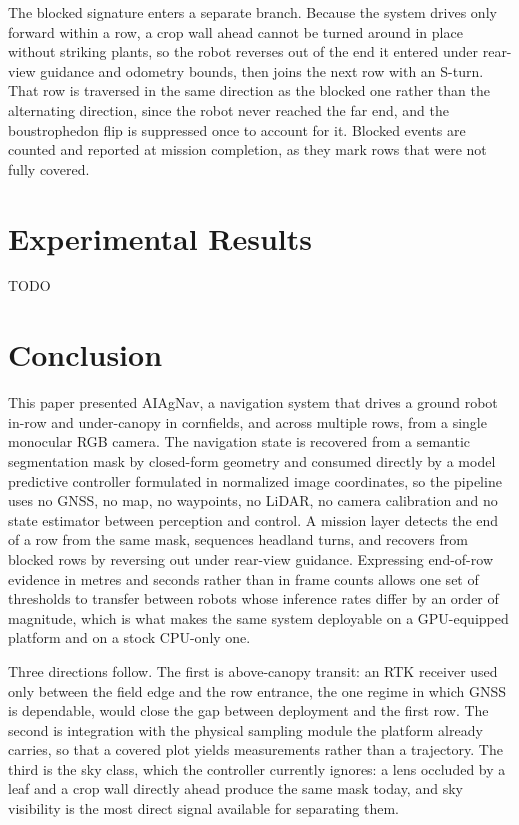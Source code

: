 \documentclass[conference]{IEEEtran}
\begin{document}
The blocked signature enters a separate branch. Because the system drives only
forward within a row, a crop wall ahead cannot be turned around in place
without striking plants, so the robot reverses out of the end it entered under
rear-view guidance and odometry bounds, then joins the next row with an S-turn.
That row is traversed in the same direction as the blocked one rather than the
alternating direction, since the robot never reached the far end, and the
boustrophedon flip is suppressed once to account for it. Blocked events are
counted and reported at mission completion, as they mark rows that were not
fully covered.

\section{Experimental Results}
TODO

\section{Conclusion}
This paper presented AIAgNav, a navigation system that drives a ground robot
in-row and under-canopy in cornfields, and across multiple rows, from a single
monocular RGB camera. The navigation state is recovered from a semantic
segmentation mask by closed-form geometry and consumed directly by a model
predictive controller formulated in normalized image coordinates, so the
pipeline uses no GNSS, no map, no waypoints, no LiDAR, no camera calibration
and no state estimator between perception and control. A mission layer detects
the end of a row from the same mask, sequences headland turns, and recovers
from blocked rows by reversing out under rear-view guidance. Expressing
end-of-row evidence in metres and seconds rather than in frame counts allows one
set of thresholds to transfer between robots whose inference rates differ by an
order of magnitude, which is what makes the same system deployable on a
GPU-equipped platform and on a stock CPU-only one.

Three directions follow. The first is above-canopy transit: an RTK receiver used
only between the field edge and the row entrance, the one regime in which GNSS
is dependable, would close the gap between deployment and the first row. The
second is integration with the physical sampling module the platform already
carries, so that a covered plot yields measurements rather than a trajectory.
The third is the sky class, which the controller currently ignores: a lens
occluded by a leaf and a crop wall directly ahead produce the same mask today,
and sky visibility is the most direct signal available for separating them.



\end{document}
